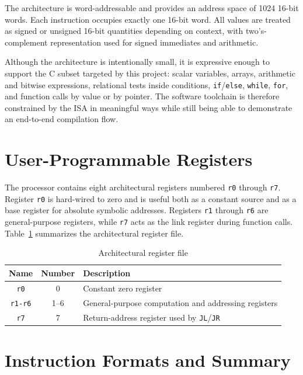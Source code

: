 \documentclass[12pt]{report}
\begin{document}
The architecture is word-addressable and provides an address space of 1024
16-bit words. Each instruction occupies exactly one 16-bit word. All values are
treated as signed or unsigned 16-bit quantities depending on context, with
two's-complement representation used for signed immediates and arithmetic.

Although the architecture is intentionally small, it is expressive enough to
support the C subset targeted by this project: scalar variables, arrays,
arithmetic and bitwise expressions, relational tests inside conditions,
\texttt{if}/\texttt{else}, \texttt{while}, \texttt{for}, and function calls by
value or by pointer. The software toolchain is therefore constrained by the ISA
in meaningful ways while still being able to demonstrate an end-to-end
compilation flow.

\section{User-Programmable Registers}

The processor contains eight architectural registers numbered \texttt{r0}
through \texttt{r7}. Register \texttt{r0} is hard-wired to zero and is useful
both as a constant source and as a base register for absolute symbolic
addresses. Registers \texttt{r1} through \texttt{r6} are general-purpose
registers, while \texttt{r7} acts as the link register during function calls.
Table~\ref{tab:arch-regs} summarizes the architectural register file.

\begin{table}[!htbp]
\centering
\begin{tabular}{|c|c|l|}
\hline
\textbf{Name} & \textbf{Number} & \textbf{Description} \\ \hline
\texttt{r0} & 0 & Constant zero register \\ \hline
\texttt{r1-r6} & 1--6 & General-purpose computation and addressing registers \\ \hline
\texttt{r7} & 7 & Return-address register used by \texttt{JL}/\texttt{JR} \\ \hline
\end{tabular}
\caption{Architectural register file}
\label{tab:arch-regs}
\end{table}

\section{Instruction Formats and Summary}
\end{document}
